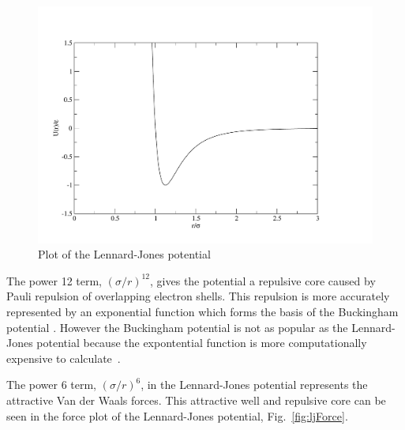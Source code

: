 \documentclass[12pt]{UoAthesis}
\begin{document}
\begin{figure}[htp] 
  \begin{center}
    \includegraphics[clip,width=\textwidth]{figures/ljPlot} 
    \caption{\label{fig:ljPot} Plot of the Lennard-Jones potential}
  \end{center}
\end{figure}

The power 12 term, $\left(\sigma/r\right)^{12}$, gives the potential a
repulsive core caused by Pauli repulsion of overlapping electron
shells.  This repulsion is more accurately represented by an
exponential function which forms the basis of the Buckingham potential
\cite{Buckingham1938}.  However the Buckingham potential is not as
popular as the Lennard-Jones potential because the expontential
function is more computationally expensive to
calculate~\cite{White1997}.

The power 6 term, $\left(\sigma/r\right)^{6}$, in the Lennard-Jones
potential represents the attractive Van der Waals forces.  This
attractive well and repulsive core can be seen in the force plot 
of the Lennard-Jones potential, Fig.~\ref{fig:ljForce}.
\end{document}
